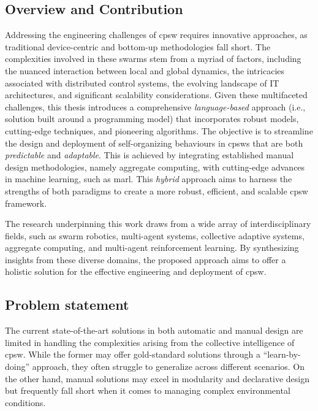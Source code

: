 \begin{refsection}
\section{Overview and Contribution}
Addressing the engineering challenges of \ac{cpsw} requires innovative approaches, 
 as traditional device-centric and bottom-up methodologies fall short. 
The complexities involved in these swarms stem from a myriad of factors, 
 including the nuanced interaction between local and global dynamics, 
 the intricacies associated with distributed control systems, 
 the evolving landscape of IT architectures, and significant scalability considerations.
%
Given these multifaceted challenges, 
 this thesis introduces a comprehensive \emph{language-based} approach (i.e., solution built around a programming model) that incorporates robust models, 
 cutting-edge techniques, and pioneering algorithms. 
 The objective is to streamline the design and deployment of self-organizing behaviours in \acp{cpsw} that are both \emph{predictable} and \emph{adaptable}. 
This is achieved by integrating established manual design methodologies, namely aggregate computing, 
 with cutting-edge advances in machine learning, such as \ac{marl}. 
%
This \emph{hybrid} approach aims to harness the strengths of both paradigms to create a more robust, efficient, and scalable \ac{cpsw} framework.

The research underpinning this work draws from a wide array of interdisciplinary fields, 
 such as swarm robotics, multi-agent systems, collective adaptive systems, aggregate computing, and multi-agent reinforcement learning. 
By synthesizing insights from these diverse domains, 
 the proposed approach aims to offer a holistic solution for the effective engineering and deployment of \acf{cpsw}.
\subsection*{Problem statement}
The current state-of-the-art solutions in both automatic and manual design are limited in handling the complexities arising from the collective intelligence of \ac{cpsw}. 
 While the former may offer gold-standard solutions through a ``learn-by-doing'' approach, 
 they often struggle to generalize across different scenarios. 
 On the other hand, manual solutions may excel in modularity and declarative design but frequently fall short when it comes to managing complex environmental conditions.

\end{refsection}
